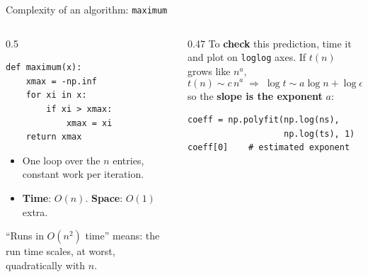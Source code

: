 \documentclass[aspectratio=169]{beamer}
\begin{document}
\begin{frame}[fragile]{Complexity of an algorithm: \texttt{maximum}}
\begin{columns}[T]
\begin{column}{0.5\textwidth}
\begin{lstlisting}
def maximum(x):
    xmax = -np.inf
    for xi in x:
        if xi > xmax:
            xmax = xi
    return xmax
\end{lstlisting}
\small
\begin{itemize}
  \item One loop over the $n$ entries, constant work per iteration.
  \item \textbf{Time}: $O(n)$. \quad \textbf{Space}: $O(1)$ extra.
\end{itemize}
\scriptsize ``Runs in $O(n^2)$ time'' means: the run time scales, at worst, quadratically with $n$.
\end{column}
\begin{column}{0.47\textwidth}
\small
To \textbf{check} this prediction, time it and plot on \texttt{loglog} axes. If $t(n)$ grows like $n^a$,
\[
t(n) \sim c\,n^{a} \;\Rightarrow\; \log t \sim a \log n + \log c ,
\]
so the \textbf{slope is the exponent} $a$:
\begin{lstlisting}
coeff = np.polyfit(np.log(ns),
                   np.log(ts), 1)
coeff[0]    # estimated exponent
\end{lstlisting}
\end{column}
\end{columns}
\end{frame}
\end{document}
